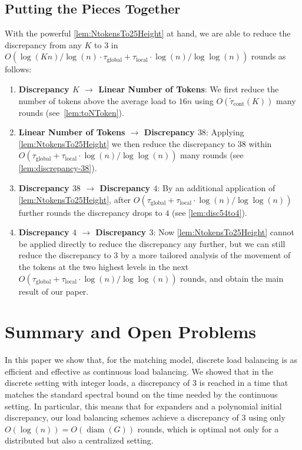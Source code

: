 \documentclass[twoside,leqno]{article}
\DeclareMathOperator{\1}{\mathbf{1}}
\newcommand{\tauspectral}[1]{{\widetilde{\tau}}_{\mathrm{cont}}\left({#1}\right)}
\newcommand{\taulocal}{\tau_{\mathrm{local}}}
\newcommand{\tauglobal}{\tau_{\mathrm{global}}}
\numberwithin{equation}{section}
\begin{document}
\subsection{Putting the Pieces Together}\label{sec:together}
With the powerful \cref{lem:NtokensTo25Height} at hand, we are able to reduce the discrepancy from any $K$ to $3$ in $O(\log(Kn)/\log(n) \cdot \tauglobal + \taulocal \cdot \log (n)/\log\log(n))$
rounds as follows:
\begin{enumerate}\itemsep0pt
    \item \textbf{Discrepancy $K$ $\rightarrow$ Linear Number of Tokens}: We first reduce the number of tokens above the average load to $16 n$ using $O(\tauspectral{K})$
    many rounds (see~\cref{lem:toNToken}).
    \item \textbf{Linear Number of Tokens $\rightarrow$ Discrepancy $38$}: Applying \cref{lem:NtokensTo25Height} we then reduce the discrepancy to $38$ within $O(\tauglobal + \taulocal \cdot \log (n)/\log\log(n))$ many rounds (see \cref{lem:discrepancy-38}).
    \item \textbf{Discrepancy $38$ $\rightarrow$ Discrepancy $4$}: By an additional application of \cref{lem:NtokensTo25Height}, after $O(\tauglobal + \taulocal \cdot \log (n)/\log\log(n))$ further rounds the discrepancy drops to $4$ (see \cref{lem:disc54to4}).
    \item \textbf{Discrepancy $4$ $\rightarrow$ Discrepancy $3$}: Now \cref{lem:NtokensTo25Height} cannot be applied directly to reduce the discrepancy any further, but we can still reduce the discrepancy to $3$ by a more tailored analysis of the movement of the tokens at the two highest levels in the next $O(\tauglobal + \taulocal \cdot \log (n)/\log\log(n))$ rounds, and obtain the main result of our paper. 
\end{enumerate}


\section{Summary and Open Problems}\label{sec:conclusions}

In this paper we show that, for the matching model, discrete load balancing is as efficient and effective as continuous load balancing.
We showed that in the discrete setting with integer loads, a discrepancy of $3$ is reached in a time that matches the standard spectral bound on the time needed by the continuous setting. In particular, this means that for expanders and a polynomial initial discrepancy, our load balancing schemes achieve a discrepancy of $3$ using only $O(\log (n))=O(\operatorname{diam}(G))$ rounds, which is optimal not only for a distributed but also a centralized setting.
\end{document}
